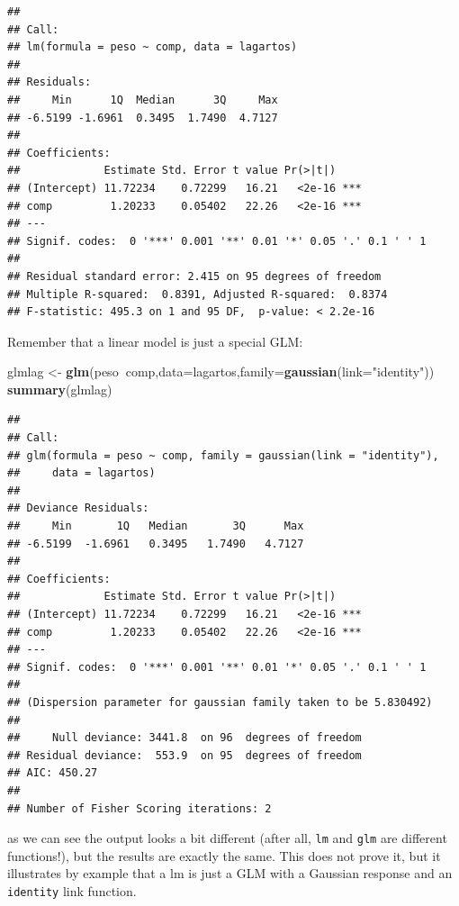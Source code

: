 \documentclass[
]{book}
\newenvironment{Shaded}{\begin{snugshade}}{\end{snugshade}}
\newcommand{\DataTypeTok}[1]{\textcolor[rgb]{0.13,0.29,0.53}{#1}}
\newcommand{\KeywordTok}[1]{\textcolor[rgb]{0.13,0.29,0.53}{\textbf{#1}}}
\newcommand{\NormalTok}[1]{#1}
\newcommand{\OperatorTok}[1]{\textcolor[rgb]{0.81,0.36,0.00}{\textbf{#1}}}
\newcommand{\StringTok}[1]{\textcolor[rgb]{0.31,0.60,0.02}{#1}}
\begin{document}
\begin{verbatim}
## 
## Call:
## lm(formula = peso ~ comp, data = lagartos)
## 
## Residuals:
##     Min      1Q  Median      3Q     Max 
## -6.5199 -1.6961  0.3495  1.7490  4.7127 
## 
## Coefficients:
##             Estimate Std. Error t value Pr(>|t|)    
## (Intercept) 11.72234    0.72299   16.21   <2e-16 ***
## comp         1.20233    0.05402   22.26   <2e-16 ***
## ---
## Signif. codes:  0 '***' 0.001 '**' 0.01 '*' 0.05 '.' 0.1 ' ' 1
## 
## Residual standard error: 2.415 on 95 degrees of freedom
## Multiple R-squared:  0.8391,	Adjusted R-squared:  0.8374 
## F-statistic: 495.3 on 1 and 95 DF,  p-value: < 2.2e-16
\end{verbatim}

Remember that a linear model is just a special GLM:

\begin{Shaded}
\begin{Highlighting}[]
\NormalTok{glmlag <-}\StringTok{ }\KeywordTok{glm}\NormalTok{(peso}\OperatorTok{~}\NormalTok{comp,}\DataTypeTok{data=}\NormalTok{lagartos,}\DataTypeTok{family=}\KeywordTok{gaussian}\NormalTok{(}\DataTypeTok{link=}\StringTok{"identity"}\NormalTok{))}
\KeywordTok{summary}\NormalTok{(glmlag)}
\end{Highlighting}
\end{Shaded}

\begin{verbatim}
## 
## Call:
## glm(formula = peso ~ comp, family = gaussian(link = "identity"), 
##     data = lagartos)
## 
## Deviance Residuals: 
##     Min       1Q   Median       3Q      Max  
## -6.5199  -1.6961   0.3495   1.7490   4.7127  
## 
## Coefficients:
##             Estimate Std. Error t value Pr(>|t|)    
## (Intercept) 11.72234    0.72299   16.21   <2e-16 ***
## comp         1.20233    0.05402   22.26   <2e-16 ***
## ---
## Signif. codes:  0 '***' 0.001 '**' 0.01 '*' 0.05 '.' 0.1 ' ' 1
## 
## (Dispersion parameter for gaussian family taken to be 5.830492)
## 
##     Null deviance: 3441.8  on 96  degrees of freedom
## Residual deviance:  553.9  on 95  degrees of freedom
## AIC: 450.27
## 
## Number of Fisher Scoring iterations: 2
\end{verbatim}

as we can see the output looks a bit different (after all, \texttt{lm} and \texttt{glm} are different functions!), but the results are exactly the same. This does not prove it, but it illustrates by example that a lm is just a GLM with a Gaussian response and an \texttt{identity} link function.
\end{document}
